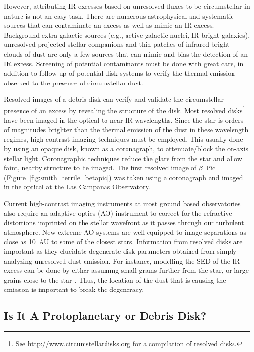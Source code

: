         However, attributing IR excesses based on unresolved fluxes to be circumstellar in nature is not an easy task. There are numerous astrophysical and systematic sources that can contaminate an excess as well as mimic an IR excess. Background extra-galactic sources (e.g., active galactic nuclei, IR bright galaxies), unresolved projected stellar companions and thin patches of infrared bright clouds of dust are only a few sources that can mimic and bias the detection of an IR excess. Screening of potential contaminants must be done with great care, in addition to follow up of potential disk systems to verify the thermal emission observed to the presence of circumstellar dust.
        
    Resolved images of a debris disk can verify and validate the circumstellar presence of an excess by revealing the structure of the disk. Most resolved disks\footnote{See \url{http://www.circumstellardisks.org} for a compilation of resolved disks.} have been imaged in the optical to near-IR wavelengths. Since the star is orders of magnitudes brighter than the thermal emission of the dust in these wavelength regimes, high-contrast imaging techniques must be employed. This usually done by using an opaque disk, known as a coronagraph, to attenuate/block the on-axis stellar light. Coronagraphic techniques reduce the glare from the star and allow faint, nearby structure to be imaged. The first resolved image of $\beta$~Pic (Figure~\ref{fig:smith_terrile_betapic}) was taken using a coronagraph and imaged in the optical at the Las Campanas Observatory.
        
    Current high-contrast imaging instruments at most ground based observatories also require an adaptive optics (AO) instrument to correct for the refractive distortions imprinted on the stellar wavefront as it passes through our turbulent atmosphere. New extreme-AO systems \citet[e.g., Gemini Planet Imager,][]{Macintosh2006} are well equipped to image separations as close as 10~AU to some of the closest stars. Information from resolved disks are important as they elucidate degenerate disk parameters obtained from simply analyzing unresolved dust emission. For instance, modelling the SED of the IR excess can be done by either assuming small grains further from the star, or large grains close to the star \citep{Krivov2010}. Thus, the location of the dust that is causing the emission is important to break the degeneracy\citep[e.g., Figure 13][]{Su2006}. 
        
        
    \subsection{Is It A Protoplanetary or Debris Disk?}
    
